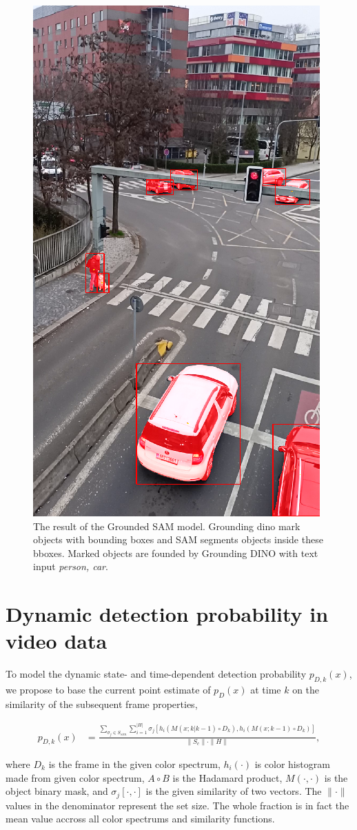 \begin{figure}[h]
  \centering
  \includegraphics[width=0.35\linewidth]{text/chapter_04/imgs/DINO_example}
  \caption{The result of the Grounded SAM model. Grounding dino mark objects with bounding boxes and SAM segments objects inside these bboxes. Marked objects are founded by Grounding DINO with text input \textit{person, car}.}
  \label{fig:GroundedSAM}
\end{figure}



\section{Dynamic detection probability in video data}
\label{sec:dynamic_pd}
To model the dynamic state- and time-dependent detection probability $p_{D,k}(x)$, we propose to base the current
point estimate of $p_{D}(x)$ at time $k$ on the similarity of the subsequent frame properties,

  \begin{align}
    p_{D,k}(x) &= \frac{\sum_{\sigma_j \in S_{sim}} \sum_{i=1}^{|H|}
      \sigma_j\left[h_i\left(M(x; k|k-1) \!\circ\! D_k\right),
        h_i\left(M(x; k-1) \!\circ\! D_k\right)\right]}{\|S_c\| \cdot \|H\|}, \label{eq:similarity}
  \end{align}

where $D_k$ is the frame in the given color spectrum, $h_i(\cdot)$ is color histogram made from given color spectrum, $A\circ B$ is the Hadamard product, $M(\cdot, \cdot)$ is the object binary mask, and $\sigma_j[\cdot, \cdot]$ is the given similarity of two vectors. The $\|\cdot\|$ values in the denominator represent the set size. The whole fraction is in fact the mean value accross all color spectrums and similarity functions.

